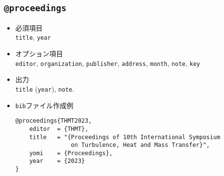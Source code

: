 \documentclass[a4paper,fleqn,uplatex,dvipdfmx]{jsarticle}
\begin{document}
\subsection{\texttt{@proceedings}}
\label{ssec:proceedings}
\begin{screen}
    \begin{itemize}
        \item 必須項目 \\
        \verb|title|, \verb|year|
        \item オプション項目 \\
        \verb|editor|, \verb|organization|, \verb|publisher|, \verb|address|, \verb|month|, \verb|note|, \verb|key|
        \item 出力 \\
            \colorbox[gray]{0.8}{\texttt{title}} (\colorbox[gray]{0.8}{\texttt{year}}), \colorbox[gray]{0.8}{\texttt{note}}.
        \item \verb|bib|ファイル作成例 \vspace{-3mm}
\begin{verbatim}
@proceedings{THMT2023,
    editor  = {THMT},
    title   = "{Proceedings of 10th International Symposium 
                on Turbulence, Heat and Mass Transfer}",
    yomi    = {Proceedings},
    year    = {2023}
}
\end{verbatim}
    \end{itemize}
\end{screen}
\end{document}
